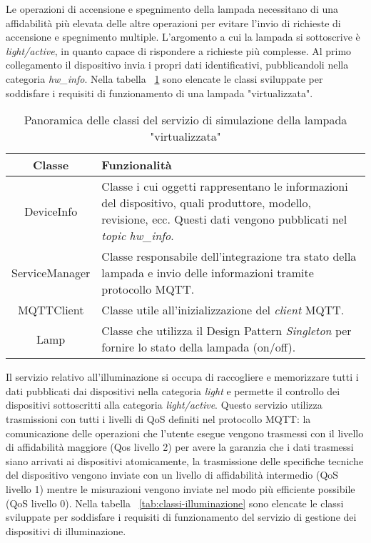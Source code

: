 Le operazioni di accensione e spegnimento della lampada necessitano di una affidabilità più elevata delle altre operazioni per evitare l'invio di richieste di accensione e spegnimento multiple.
L'argomento a cui la lampada si sottoscrive è \emph{light/active}, in quanto capace di rispondere a richieste più complesse. Al primo collegamento il dispositivo invia i propri dati identificativi, pubblicandoli nella categoria \emph{hw\_info}.
Nella tabella ~\ref{tab:classi-lampada} sono elencate le classi sviluppate per soddisfare i requisiti di funzionamento di una lampada "virtualizzata".


\begin{table}[!h]
\caption{Panoramica delle classi del servizio di simulazione della lampada "virtualizzata"}
\label{tab:classi-lampada}
\begin{tabularx}{\linewidth}{|c|X|}
\hline
\textbf{Classe} & \textbf{Funzionalità} \\
\hline
DeviceInfo & Classe i cui oggetti rappresentano le informazioni del dispositivo, quali produttore, modello, revisione, ecc. Questi dati vengono pubblicati nel \emph{topic} \emph{hw\_info}. \\
\hline
ServiceManager & Classe responsabile dell'integrazione tra stato della lampada e invio delle informazioni tramite protocollo MQTT. \\
\hline
MQTTClient & Classe utile all'inizializzazione del \emph{client} MQTT. \\
\hline
Lamp & Classe che utilizza il Design Pattern \emph{Singleton} per fornire lo stato della lampada (on/off). \\
\hline
\end{tabularx}
\end{table}


Il servizio relativo all'illuminazione si occupa di raccogliere e memorizzare tutti i dati pubblicati dai dispositivi nella categoria \emph{light} e permette il controllo dei dispositivi sottoscritti alla categoria \emph{light/active}.
Questo servizio utilizza trasmissioni con tutti i livelli di QoS definiti nel protocollo MQTT: la comunicazione delle operazioni che l'utente esegue vengono trasmessi con il livello di affidabilità maggiore (Qos livello 2) per avere la garanzia che i dati trasmessi siano arrivati ai dispositivi atomicamente, la trasmissione delle specifiche tecniche del dispositivo vengono inviate con un livello di affidabilità intermedio (QoS livello 1) mentre le misurazioni vengono inviate nel modo più efficiente possibile (QoS livello 0).
Nella tabella ~\ref{tab:classi-illuminazione} sono elencate le classi sviluppate per soddisfare i requisiti di funzionamento del servizio di gestione dei dispositivi di illuminazione.

